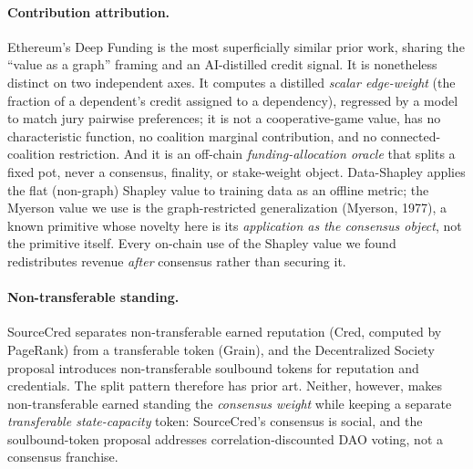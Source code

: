 \documentclass[10pt]{article}
\begin{document}
\paragraph{Contribution attribution.} Ethereum's Deep Funding is the most superficially similar prior
work, sharing the ``value as a graph'' framing and an AI-distilled credit signal. It is nonetheless
distinct on two independent axes. It computes a distilled \emph{scalar edge-weight} (the fraction of a
dependent's credit assigned to a dependency), regressed by a model to match jury pairwise preferences;
it is not a cooperative-game value, has no characteristic function, no coalition marginal contribution,
and no connected-coalition restriction. And it is an off-chain \emph{funding-allocation oracle} that
splits a fixed pot, never a consensus, finality, or stake-weight object. Data-Shapley applies the flat
(non-graph) Shapley value to training data as an offline metric; the Myerson value we use is the
graph-restricted generalization (Myerson, 1977), a known primitive whose novelty here is its
\emph{application as the consensus object}, not the primitive itself. Every on-chain use of the Shapley
value we found redistributes revenue \emph{after} consensus rather than securing it.

\paragraph{Non-transferable standing.} SourceCred separates non-transferable earned reputation (Cred,
computed by PageRank) from a transferable token (Grain), and the Decentralized Society proposal
introduces non-transferable soulbound tokens for reputation and credentials. The split pattern therefore
has prior art. Neither, however, makes non-transferable earned standing the \emph{consensus weight} while
keeping a separate \emph{transferable state-capacity} token: SourceCred's consensus is social, and the
soulbound-token proposal addresses correlation-discounted DAO voting, not a consensus franchise.
\end{document}
